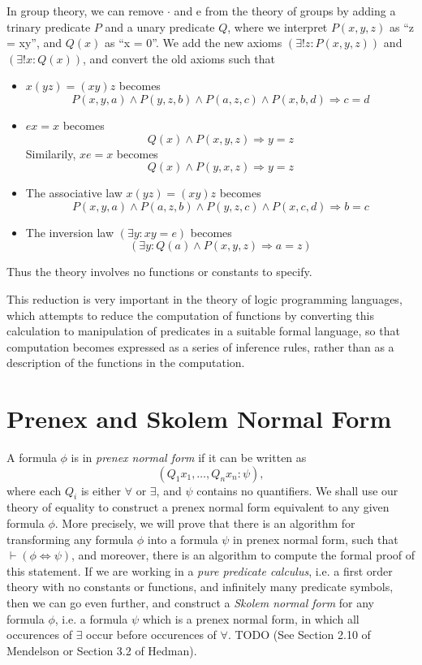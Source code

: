 \begin{example}
    In group theory, we can remove $\cdot$ and e from the theory of groups by adding a trinary predicate $P$ and a unary predicate $Q$, where we interpret $P(x,y,z)$ as ``z = xy'', and $Q(x)$ as ``x = 0''. We add the new axioms $(\exists ! z : P(x,y,z))$ and $(\exists ! x : Q(x))$, and convert the old axioms such that
    \begin{itemize}
        \item $x(yz) = (xy)z$ becomes
        \[ P(x,y,a) \wedge P(y,z,b) \wedge P(a,z,c) \wedge P(x,b,d) \Rightarrow c = d \]
        \item $ex = x$ becomes
        \[ Q(x) \wedge P(x,y,z) \Rightarrow y = z \]
        Similarily, $xe = x$ becomes
        \[ Q(x) \wedge P(y,x,z) \Rightarrow y = z \]
        \item The associative law $x(yz) = (xy)z$ becomes
        \[ P(x,y,a) \wedge P(a,z,b) \wedge P(y,z,c) \wedge P(x,c,d) \Rightarrow b = c \]
        \item The inversion law $(\exists y: xy = e)$ becomes
        \[ (\exists y: Q(a) \wedge P(x,y,z) \Rightarrow a = z) \]
    \end{itemize}
    Thus the theory involves no functions or constants to specify.
\end{example}

This reduction is very important in the theory of logic programming languages, which attempts to reduce the computation of functions by converting this calculation to manipulation of predicates in a suitable formal language, so that computation becomes expressed as a series of inference rules, rather than as a description of the functions in the computation.

\section{Prenex and Skolem Normal Form}

A formula $\phi$ is in \emph{prenex normal form} if it can be written as
%
\[ (Q_1 x_1, \dots, Q_n x_n : \psi), \]
%
where each $Q_i$ is either $\forall$ or $\exists$, and $\psi$ contains no quantifiers. We shall use our theory of equality to construct a prenex normal form equivalent to any given formula $\phi$. More precisely, we will prove that there is an algorithm for transforming any formula $\phi$ into a formula $\psi$ in prenex normal form, such that $\vdash (\phi \Leftrightarrow \psi)$, and moreover, there is an algorithm to compute the formal proof of this statement. If we are working in a \emph{pure predicate calculus}, i.e. a first order theory with no constants or functions, and infinitely many predicate symbols, then we can go even further, and construct a \emph{Skolem normal form} for any formula $\phi$, i.e. a formula $\psi$ which is a prenex normal form, in which all occurences of $\exists$ occur before occurences of $\forall$. TODO (See Section 2.10 of Mendelson or Section 3.2 of Hedman).


